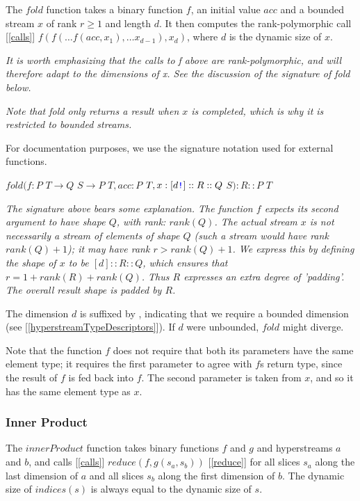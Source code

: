 \documentclass{article}
\begin{document}
The $fold$ function takes a binary function $f$, an initial value $acc$ and a bounded stream $x$ of rank $r \ge 1$ and length $d$. It then computes the rank-polymorphic call [\ref{calls}]
$f(f( \ldots f(acc, x_1), \ldots x_{d-1}), x_d)$, where $d$ is the dynamic size of $x$.

{\em It is worth emphasizing that the calls to f above are rank-polymorphic, and will therefore adapt to the dimensions of x. See the discussion of the signature of fold below.
}

{\em Note that fold only returns a result when $x$ is completed, which is why it is restricted to bounded streams.}

For documentation purposes, we use the signature notation used for external functions.

$fold(f: P$ $T \to{}Q$ $S \to{}P$ $T, acc: P$ $T, x:[d\texttt{\color{blue} !}]::R::Q $ $S): R::P $ $T $

{\em
The signature above bears some explanation. The function $f$ expects its second argument to have shape $Q$, with rank: $rank(Q)$. The actual stream $x$ is not necessarily a stream of elements of shape $Q$ (such a stream would have rank $rank(Q) +1$); it may have rank $r \gt rank(Q) + 1$. We express this by defining the shape of $x$ to be $[d]::R::Q$, which ensures that $r = 1 + rank(R) + rank(Q)$. Thus $R$ expresses an extra degree of 'padding'. The overall result shape is padded by $R$.

The dimension $d$ is suffixed by \BANG{}, indicating that we require a bounded dimension (see [\ref{hyperstreamTypeDescriptors}]). If $d$ were unbounded, $fold$ might diverge.

Note that the function $f$ does not require that both its parameters have the same element type; it requires the first parameter to agree with $f$s return type, since the result of $f$ is fed back  into $f$. The second parameter is taken from $x$, and so it has the same element type as $x$. 
}

\subsubsection{Inner Product}
\label{innerProduct}

The $innerProduct$ function takes binary functions $f$ and $g$ and hyperstreams $a$ and $b$, and calls [\ref{calls}] $reduce(f, g(s_a, s_b))$ [\ref{reduce}] for all slices $s_a$ along the last dimension of  $a$ and all slices  $s_b$ along the first dimension of $b$. The dynamic size  of $indices(s)$ is  always equal to the dynamic size of $s$.
\end{document}
